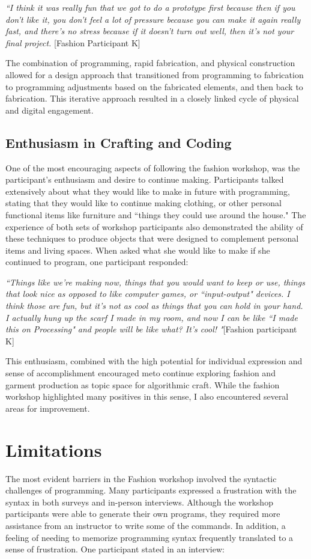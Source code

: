 \textit{``I think it was really fun that we got to do a prototype first because then if you don't like it, you don't feel a lot of pressure because you can make it again really fast, and there's no stress because if it doesn't turn out well, then it's not your final project.} [Fashion Participant K]

The combination of programming, rapid fabrication, and physical construction allowed for a design approach that transitioned from programming to fabrication to programming adjustments based on the fabricated elements, and then back to fabrication. This iterative approach resulted in a closely linked cycle of physical and digital engagement. 

 \subsection{Enthusiasm in Crafting and Coding}
One of the most encouraging aspects of following the fashion workshop, was the participant's enthusiasm and desire to continue making. Participants talked extensively about what they would like to make in future with programming, stating that they would like to continue making clothing, or other personal functional items like furniture and ``things they could use around the house." The experience of both sets of workshop participants also demonstrated the ability of these techniques to produce objects that were designed to complement personal items and living spaces. When asked what she would like to make if she continued to program, one participant responded: 

\textit{``Things like we're making now, things that you would want to keep or use, things that look nice as opposed to like computer games, or ``input-output" devices. I think those are fun, but it's not as cool as things that you can hold in your hand. I actually hung up the scarf I made in my room, and now I can be like ``I made this on Processing" and people will be like what? It's cool! "}[Fashion participant K]

This enthusiasm, combined with the high potential for individual expression and sense of accomplishment encouraged meto continue exploring fashion and garment production as topic space for algorithmic craft. While the fashion workshop highlighted many positives in this sense, I also encountered several areas for improvement. 

\section{Limitations}
The most evident barriers in the Fashion workshop involved the syntactic challenges of programming. Many participants expressed a frustration with the syntax in both surveys and in-person interviews. Although the workshop participants were able to generate their own programs, they required more assistance from an instructor to write some of the commands. In addition, a feeling of needing to memorize programming syntax frequently translated to a sense of frustration. One participant stated in an interview:

